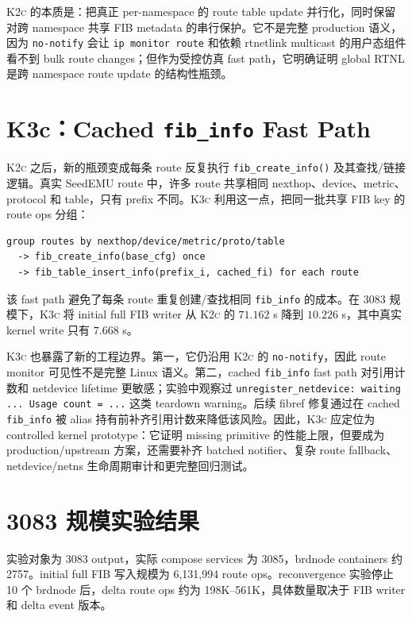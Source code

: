 \documentclass[UTF8]{ctexart}
\newcommand{\code}[1]{\texttt{#1}}
\newcommand{\method}[1]{\textsc{#1}}
\begin{document}
\method{K2c} 的本质是：把真正 per-namespace 的 route table update 并行化，同时保留对跨 namespace 共享 FIB metadata 的串行保护。它不是完整 production 语义，因为 \code{no-notify} 会让 \code{ip monitor route} 和依赖 rtnetlink multicast 的用户态组件看不到 bulk route changes；但作为受控仿真 fast path，它明确证明 global RTNL 是跨 namespace route update 的结构性瓶颈。

\section{K3c：Cached \texorpdfstring{\code{fib\_info}}{fib\_info} Fast Path}

\method{K2c} 之后，新的瓶颈变成每条 route 反复执行 \code{fib\_create\_info()} 及其查找/链接逻辑。真实 SeedEMU route 中，许多 route 共享相同 nexthop、device、metric、protocol 和 table，只有 prefix 不同。\method{K3c} 利用这一点，把同一批共享 FIB key 的 route ops 分组：

\begin{lstlisting}
group routes by nexthop/device/metric/proto/table
  -> fib_create_info(base_cfg) once
  -> fib_table_insert_info(prefix_i, cached_fi) for each route
\end{lstlisting}

该 fast path 避免了每条 route 重复创建/查找相同 \code{fib\_info} 的成本。在 3083 规模下，\method{K3c} 将 initial full FIB writer 从 \method{K2c} 的 $71.162$ s 降到 $10.226$ s，其中真实 kernel write 只有 $7.668$ s。

\method{K3c} 也暴露了新的工程边界。第一，它仍沿用 \method{K2c} 的 \code{no-notify}，因此 route monitor 可见性不是完整 Linux 语义。第二，cached \code{fib\_info} fast path 对引用计数和 netdevice lifetime 更敏感；实验中观察过 \code{unregister\_netdevice: waiting ... Usage count = ...} 这类 teardown warning。后续 fibref 修复通过在 cached \code{fib\_info} 被 alias 持有前补齐引用计数来降低该风险。因此，\method{K3c} 应定位为 controlled kernel prototype：它证明 missing primitive 的性能上限，但要成为 production/upstream 方案，还需要补齐 batched notifier、复杂 route fallback、netdevice/netns 生命周期审计和更完整回归测试。

\section{3083 规模实验结果}

实验对象为 3083 output，实际 compose services 为 3085，brdnode containers 约 2757。initial full FIB 写入规模为 6,131,994 route ops。reconvergence 实验停止 10 个 brdnode 后，delta route ops 约为 198K--561K，具体数量取决于 FIB writer 和 delta event 版本。
\end{document}
